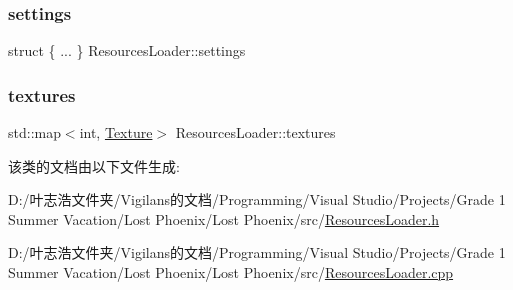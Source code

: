 \mbox{\label{class_resources_loader_a2310f32324c20d8294cfbfd893f1c2d9}} 
\subsubsection{\texorpdfstring{settings}{settings}}
{\footnotesize\ttfamily struct \{ ... \}   Resources\+Loader\+::settings}

\mbox{\label{class_resources_loader_a5b18435b040ae9562a84570712be922c}} 
\subsubsection{\texorpdfstring{textures}{textures}}
{\footnotesize\ttfamily std\+::map$<$int, \hyperlink{struct_texture}{Texture}$>$ Resources\+Loader\+::textures}



该类的文档由以下文件生成\+:\begin{DoxyCompactItemize}
\item 
D\+:/叶志浩文件夹/\+Vigilans的文档/\+Programming/\+Visual Studio/\+Projects/\+Grade 1 Summer Vacation/\+Lost Phoenix/\+Lost Phoenix/src/\hyperlink{_resources_loader_8h}{Resources\+Loader.\+h}\item 
D\+:/叶志浩文件夹/\+Vigilans的文档/\+Programming/\+Visual Studio/\+Projects/\+Grade 1 Summer Vacation/\+Lost Phoenix/\+Lost Phoenix/src/\hyperlink{_resources_loader_8cpp}{Resources\+Loader.\+cpp}\end{DoxyCompactItemize}
